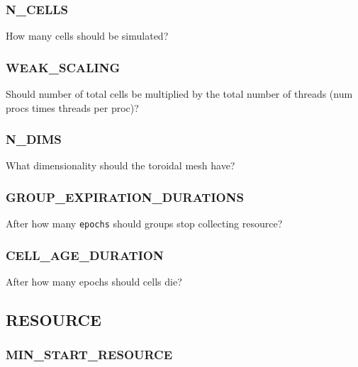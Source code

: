 \subsubsection{N\_CELLS}


How many cells should be simulated?

\subsubsection{WEAK\_SCALING}


Should number of total cells be multiplied by the total number of threads (num procs times threads per proc)?

\subsubsection{N\_DIMS}


What dimensionality should the toroidal mesh have?

\subsubsection{GROUP\_EXPIRATION\_DURATIONS}


After how many \texttt{epochs} should groups stop collecting resource?

\subsubsection{CELL\_AGE\_DURATION}


After how many epochs should cells die?


\subsection{RESOURCE}


\subsubsection{MIN\_START\_RESOURCE}

